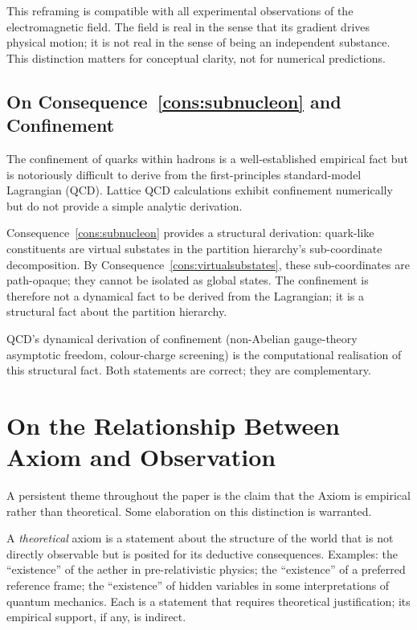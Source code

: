 \documentclass[11pt,twocolumn,a4paper]{article}
\theoremstyle{axiomstyle}
\theoremstyle{conseqstyle}
\theoremstyle{definition}
\theoremstyle{remark}
\begin{document}
This reframing is compatible with all experimental observations of the electromagnetic field. The field is real in the sense that its gradient drives physical motion; it is not real in the sense of being an independent substance. This distinction matters for conceptual clarity, not for numerical predictions.

\subsection{On Consequence~\ref{cons:subnucleon} and Confinement}

The confinement of quarks within hadrons is a well-established empirical fact but is notoriously difficult to derive from the first-principles standard-model Lagrangian (QCD). Lattice QCD calculations exhibit confinement numerically but do not provide a simple analytic derivation.

Consequence~\ref{cons:subnucleon} provides a structural derivation: quark-like constituents are virtual substates in the partition hierarchy's sub-coordinate decomposition. By Consequence~\ref{cons:virtualsubstates}, these sub-coordinates are path-opaque; they cannot be isolated as global states. The confinement is therefore not a dynamical fact to be derived from the Lagrangian; it is a structural fact about the partition hierarchy.

QCD's dynamical derivation of confinement (non-Abelian gauge-theory asymptotic freedom, colour-charge screening) is the computational realisation of this structural fact. Both statements are correct; they are complementary.

\section{On the Relationship Between Axiom and Observation}
\label{app:observation}

A persistent theme throughout the paper is the claim that the Axiom is empirical rather than theoretical. Some elaboration on this distinction is warranted.

A \emph{theoretical} axiom is a statement about the structure of the world that is not directly observable but is posited for its deductive consequences. Examples: the ``existence'' of the aether in pre-relativistic physics; the ``existence'' of a preferred reference frame; the ``existence'' of hidden variables in some interpretations of quantum mechanics. Each is a statement that requires theoretical justification; its empirical support, if any, is indirect.
\end{document}
